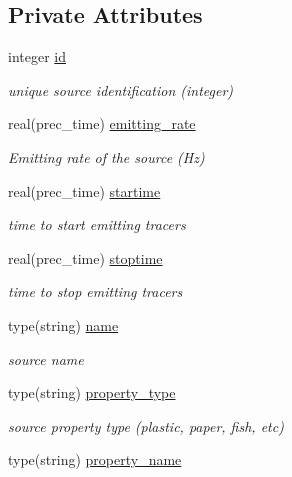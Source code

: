 \subsection*{Private Attributes}
\begin{DoxyCompactItemize}
\item 
integer \mbox{\hyperlink{structsources__mod_1_1source__par_a88d333946d18fee527b7b207f44dd3ff}{id}}
\begin{DoxyCompactList}\small\item\em unique source identification (integer) \end{DoxyCompactList}\item 
real(prec\+\_\+time) \mbox{\hyperlink{structsources__mod_1_1source__par_af5e6a5cc49766a9fb90fedadebb64b87}{emitting\+\_\+rate}}
\begin{DoxyCompactList}\small\item\em Emitting rate of the source (Hz) \end{DoxyCompactList}\item 
real(prec\+\_\+time) \mbox{\hyperlink{structsources__mod_1_1source__par_afcde2655b2a557f3a3e2c952dc8a51b0}{startime}}
\begin{DoxyCompactList}\small\item\em time to start emitting tracers \end{DoxyCompactList}\item 
real(prec\+\_\+time) \mbox{\hyperlink{structsources__mod_1_1source__par_ac2c04f0d36ad034e160e3de15fe0c283}{stoptime}}
\begin{DoxyCompactList}\small\item\em time to stop emitting tracers \end{DoxyCompactList}\item 
type(string) \mbox{\hyperlink{structsources__mod_1_1source__par_ac56d7761e7da3a906a3f0fbf4c7f49f8}{name}}
\begin{DoxyCompactList}\small\item\em source name \end{DoxyCompactList}\item 
type(string) \mbox{\hyperlink{structsources__mod_1_1source__par_a91107e1b59e5ca582c1afe6ff6263e29}{property\+\_\+type}}
\begin{DoxyCompactList}\small\item\em source property type (plastic, paper, fish, etc) \end{DoxyCompactList}\item 
type(string) \mbox{\hyperlink{structsources__mod_1_1source__par_a5939a7c20bad9ac30bc9bef0427a5336}{property\+\_\+name}}

\end{DoxyCompactItemize}
